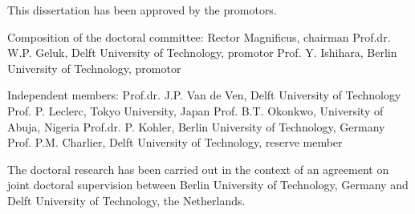 This dissertation has been approved by the promotors.  

Composition of the doctoral committee:  
Rector Magnificus, chairman  
Prof.dr. W.P. Geluk, Delft University of Technology, promotor  
Prof. Y. Ishihara, Berlin University of Technology, promotor  

Independent members:  
Prof.dr. J.P. Van de Ven, Delft University of Technology  
Prof. P. Leclerc, Tokyo University, Japan  
Prof. B.T. Okonkwo, University of Abuja, Nigeria  
Prof.dr. P. Kohler, Berlin University of Technology, Germany  
Prof. P.M. Charlier, Delft University of Technology, reserve member  

The doctoral research has been carried out in the context of an agreement on joint doctoral supervision between Berlin University of Technology, Germany and Delft University of Technology, the Netherlands.
